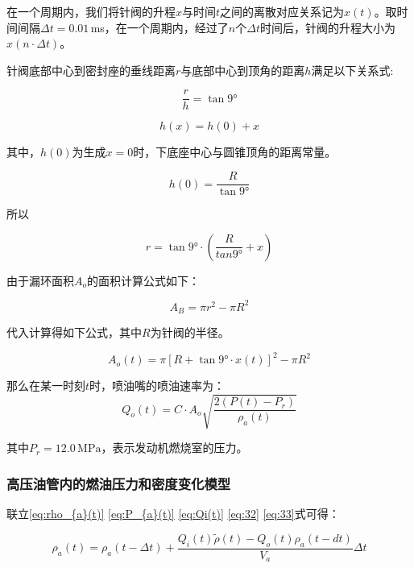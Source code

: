 \documentclass[withoutpreface,bwprint]{cumcmthesis} %
\begin{document}
在一个周期内，我们将针阀的升程$x$与时间$t$之间的离散对应关系记为$x(t)$。取时间间隔$\Delta t=0.01\,$ms，在一个周期内，经过了$n$个$\Delta t$时间后，针阀的升程大小为$x(n\cdot \Delta t)$。

针阀底部中心到密封座的垂线距离$r$与底部中心到顶角的距离$h$满足以下关系式:

\begin{equation}
\frac{r}{h}=\tan 9°
\end{equation}

\begin{equation}
h(x)=h(0)+x
\end{equation}

其中，$h(0)$为生成$x=0$时，下底座中心与圆锥顶角的距离常量。

\begin{equation}
h(0)=\frac{R}{\tan 9°}
\end{equation}

所以

\begin{equation}
r=\tan 9° \cdot(\frac{R}{tan9°}+x)
\end{equation}

由于漏环面积$A_o$的面积计算公式如下：

\begin{equation}
A_B=\pi r^2-\pi R^2
\end{equation}

代入计算得如下公式，其中$R$为针阀的半径。

\begin{equation}
A_{o}(t)=\pi\left[R+\tan 9° \cdot x(t)\right]^2-\pi R^2
\end{equation}

那么在某一时刻$t$时，喷油嘴的喷油速率为：
\begin{equation}
Q_{o}(t)=C\cdot A_{o} \sqrt{\frac{2\left(P(t)-P_{r}\right)}{\rho_{a}(t)}}
\end{equation}

其中$P_{r}=12.0\,\text{MPa}$，表示发动机燃烧室的压力。

\subsubsection{高压油管内的燃油压力和密度变化模型}

联立\cref{eq:rho_{a}(t)} \cref{eq:P_{a}(t)} \cref{eq:Qi(t)} \cref{eq:32} \cref{eq:33}式可得：

\begin{equation}
\rho_a(t)=\rho_a(t-\Delta t)+\frac{Q_i(t) \widetilde{\rho}(t)-Q_{o}(t)\rho_{a}(t-dt)}{V_{a}}\Delta t		
\end{equation}
\end{document}
